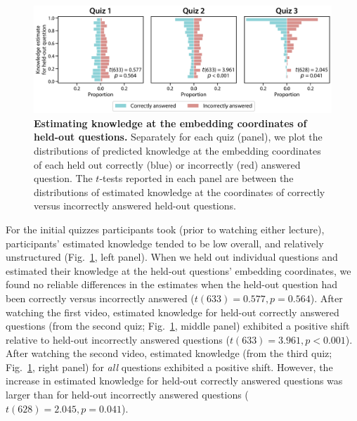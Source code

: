 \documentclass[10pt]{article}
\begin{document}
\begin{figure}[tp]
    \centering
    \includegraphics[width=\textwidth]{figs/held-out-question-analysis}
    
    \caption{\textbf{Estimating knowledge at the embedding coordinates of
    held-out questions.} Separately for each quiz (panel), we plot the
    distributions of predicted knowledge at the embedding coordinates of each
    held out correctly (blue) or incorrectly (red) answered question. The
    $t$-tests reported in each panel are between the distributions of estimated
    knowledge at the coordinates of correctly versus incorrectly answered
    held-out questions.}
    
    \label{fig:predictions}
\end{figure}

For the initial quizzes participants took (prior to watching either lecture),
participants' estimated knowledge tended to be low overall, and relatively
unstructured (Fig.~\ref{fig:predictions}, left panel). When we held out
individual questions and estimated their knowledge at the held-out questions'
embedding coordinates, we found no reliable differences in the estimates when
the held-out question had been correctly versus incorrectly answered ($t(633) =
0.577, p = 0.564$). After watching the first video, estimated knowledge for
held-out correctly answered questions (from the second quiz;
Fig.~\ref{fig:predictions}, middle panel) exhibited a positive shift relative
to held-out incorrectly answered questions ($t(633) = 3.961, p < 0.001$). After
watching the second video, estimated knowledge (from the third quiz;
Fig.~\ref{fig:predictions}, right panel) for \textit{all} questions exhibited a
positive shift. However, the increase in estimated knowledge for held-out
correctly answered questions was larger than for held-out incorrectly answered
questions ($t(628) = 2.045, p = 0.041$).
\end{document}
